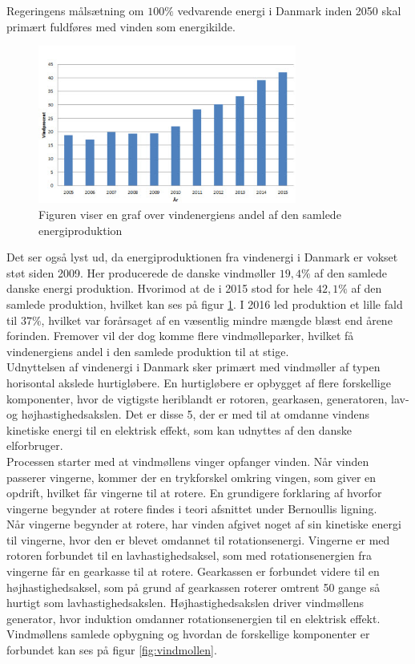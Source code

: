 Regeringens målsætning om $100 \%$ vedvarende energi i Danmark inden 2050 skal primært fuldføres med vinden som energikilde. 

\begin{figure}
\includegraphics[width=8.5cm]{Billeder/vindgraf}
\caption{Figuren viser en graf over vindenergiens andel af den samlede energiproduktion \citep{2}}
\label{fig:vindgraf}
\end{figure} 

Det ser også lyst ud, da energiproduktionen fra vindenergi i Danmark er vokset støt siden 2009. Her producerede de danske vindmøller $19,4 \%$ af den samlede danske energi produktion. Hvorimod at de i 2015 stod for hele $42,1 \%$ af den samlede produktion, hvilket kan ses på figur \ref{fig:vindgraf}. I 2016 led produktion et lille fald til $37 \%$, hvilket var forårsaget af en væsentlig mindre mængde blæst end årene forinden. Fremover vil der dog komme flere vindmølleparker, hvilket få vindenergiens andel i den samlede produktion til at stige. \\
Udnyttelsen af vindenergi i Danmark sker primært med vindmøller af typen horisontal akslede hurtigløbere.
En hurtigløbere er opbygget af flere forskellige komponenter, hvor de vigtigste heriblandt er rotoren, gearkasen, generatoren, lav- og højhastighedsakslen. Det er disse 5, der er med til at omdanne vindens kinetiske energi til en elektrisk effekt, som kan udnyttes af den danske elforbruger. \\
Processen starter med at vindmøllens vinger opfanger vinden. Når vinden passerer vingerne, kommer der en trykforskel omkring vingen, som giver en opdrift, hvilket får vingerne til at rotere. En grundigere forklaring af hvorfor vingerne begynder at rotere findes i teori afsnittet under Bernoullis ligning. \\
Når vingerne begynder at rotere, har vinden afgivet noget af sin kinetiske energi til vingerne, hvor den er blevet omdannet til rotationsenergi. Vingerne er med rotoren forbundet til en lavhastighedsaksel, som med rotationsenergien fra vingerne får en gearkasse til at rotere. Gearkassen er forbundet videre til en højhastighedsaksel, som på grund af gearkassen roterer omtrent 50 gange så hurtigt som lavhastighedsakslen. Højhastighedsakslen driver vindmøllens generator, hvor induktion omdanner rotationsenergien til en elektrisk effekt. Vindmøllens samlede opbygning og hvordan de forskellige komponenter er forbundet kan ses på figur \ref{fig:vindmollen}.

